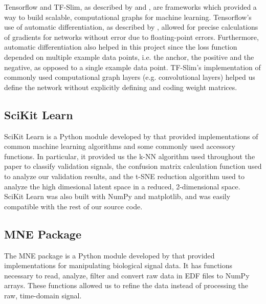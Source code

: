 Tensorflow and TF-Slim, as described by \citet{tensorflow} and \citet{tfslim},  are frameworks which provided a way to build scalable, computational graphs for machine learning. Tensorflow's use of automatic differentiation, as described by \citet{autodiff}, allowed for precise calculations of gradients for networks without error due to floating-point errors. Furthermore, automatic differentiation also helped in this project since the loss function depended on multiple example data points, i.e. the anchor, the positive and the negative,  as opposed to a single example data point. TF-Slim's implementation of commonly used computational graph layers (e.g. convolutional layers) helped us define the network without explicitly defining and coding weight matrices. 

\subsection*{SciKit Learn}
SciKit Learn is a Python module developed by \citet{sklearn} that provided implementations of common machine learning algorithms and some commonly used accessory functions. In particular, it provided us the k-NN algorithm used throughout the paper to classify validation signals, the confusion matrix calculation function used to analyze our validation results, and the t-SNE reduction algorithm used to analyze the high dimesional latent space in a reduced, 2-dimensional space. SciKit Learn was also built with NumPy and matplotlib, and was easily compatible with the rest of our source code. 

\subsection*{MNE Package}

The MNE package is a Python module developed by \citet{mne} that provided implementations for manipulating biological signal data. It has functions necessary to read, analyze, filter and convert raw data in EDF files to NumPy arrays. These functions allowed us to refine the data instead of processing the raw, time-domain signal.